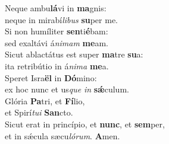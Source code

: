\evenverse Neque ambu\textbf{lá}vi in \textbf{ma}gnis:~\*\\
\evenverse neque in mirabí\textit{li}\textit{bus} \textbf{su}per me.\\
\oddverse Si non humíliter \textbf{sen}ti\textbf{é}bam:~\*\\
\oddverse sed exaltávi á\textit{ni}\textit{mam} \textbf{me}am.\\
\evenverse Sicut ablactátus est super \textbf{ma}tre \textbf{su}a:~\*\\
\evenverse ita retribútio in á\textit{ni}\textit{ma} \textbf{me}a.\\
\oddverse Speret Isra\textbf{ël} in \textbf{Dó}mino:~\*\\
\oddverse ex hoc nunc et us\textit{que} \textit{in} \textbf{sǽ}culum.\\
\evenverse Glória \textbf{Pa}tri, et \textbf{Fí}lio,~\*\\
\evenverse et Spirí\textit{tu}\textit{i} \textbf{San}cto.\\
\oddverse Sicut erat in princípio, et \textbf{nunc}, et \textbf{sem}per,~\*\\
\oddverse et in sǽcula sæcu\textit{ló}\textit{rum}. \textbf{A}men.\\

